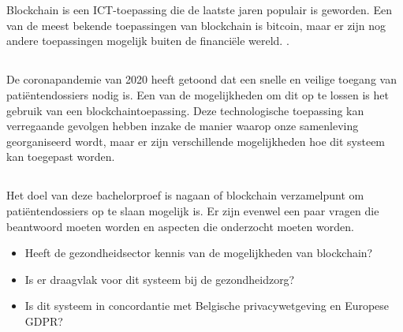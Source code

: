
\chapter{}
\label{ch:inleiding}

Blockchain is een ICT-toepassing die de laatste jaren populair is geworden. Een van de meest bekende toepassingen van blockchain is bitcoin, maar er zijn nog andere toepassingen mogelijk buiten de financiële wereld. \autocite{Pilkington2016}.

\section{}
\label{sec:probleemstelling}

De coronapandemie van 2020 heeft getoond dat een snelle en veilige toegang van patiëntendossiers nodig is. Een van de mogelijkheden om dit op te lossen is het gebruik van een blockchaintoepassing. Deze technologische toepassing kan verregaande gevolgen hebben inzake de manier waarop onze samenleving georganiseerd wordt, maar er zijn verschillende mogelijkheden hoe dit systeem kan toegepast worden.

\section{}
\label{sec:onderzoeksvraag}

Het doel van deze bachelorproef is nagaan of blockchain verzamelpunt om patiëntendossiers op te slaan mogelijk is. Er zijn evenwel een paar vragen die beantwoord moeten worden en aspecten die onderzocht moeten worden.

\begin{itemize}
    \item Heeft de gezondheidsector kennis van de mogelijkheden van blockchain?
    \item Is er draagvlak voor dit systeem bij de gezondheidzorg?
    \item Is dit systeem in concordantie met Belgische privacywetgeving en Europese GDPR?
\end{itemize}

\section{}
\label{sec:onderzoeksdoelstelling}

